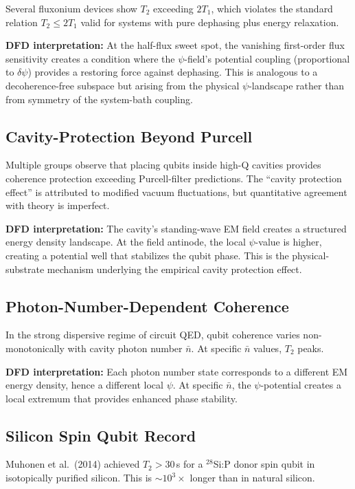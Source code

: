 \documentclass[11pt,letterpaper]{article}
\begin{document}
Several fluxonium devices show $T_2$ exceeding $2T_1$, which violates the
standard relation $T_2 \leq 2T_1$ valid for systems with pure dephasing
plus energy relaxation.

\textbf{DFD interpretation:} At the half-flux sweet spot, the vanishing
first-order flux sensitivity creates a condition where the $\psi$-field's
potential coupling (proportional to $\delta\psi$) provides a restoring
force against dephasing. This is analogous to a decoherence-free subspace
but arising from the physical $\psi$-landscape rather than from symmetry
of the system-bath coupling.

\subsection{Cavity-Protection Beyond Purcell}

Multiple groups observe that placing qubits inside high-Q cavities
provides coherence protection exceeding Purcell-filter predictions. The
``cavity protection effect'' is attributed to modified vacuum fluctuations,
but quantitative agreement with theory is imperfect.

\textbf{DFD interpretation:} The cavity's standing-wave EM field creates
a structured energy density landscape. At the field antinode, the local
$\psi$-value is higher, creating a potential well that stabilizes the
qubit phase. This is the physical-substrate mechanism underlying the
empirical cavity protection effect.

\subsection{Photon-Number-Dependent Coherence}

In the strong dispersive regime of circuit QED, qubit coherence varies
non-monotonically with cavity photon number $\bar{n}$. At specific
$\bar{n}$ values, $T_2$ peaks.

\textbf{DFD interpretation:} Each photon number state corresponds to a
different EM energy density, hence a different local $\psi$. At specific
$\bar{n}$, the $\psi$-potential creates a local extremum that provides
enhanced phase stability.

\subsection{Silicon Spin Qubit Record}

Muhonen et al.\ (2014) achieved $T_2 > 30$\,s for a $^{28}$Si:P donor
spin qubit in isotopically purified silicon. This is $\sim 10^3\times$
longer than in natural silicon.
\end{document}

